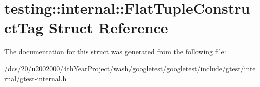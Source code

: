 \hypertarget{structtesting_1_1internal_1_1FlatTupleConstructTag}{}\section{testing\+:\+:internal\+:\+:Flat\+Tuple\+Construct\+Tag Struct Reference}
\label{structtesting_1_1internal_1_1FlatTupleConstructTag}


The documentation for this struct was generated from the following file\+:\begin{DoxyCompactItemize}
\item 
/dcs/20/u2002000/4th\+Year\+Project/wash/googletest/googletest/include/gtest/internal/gtest-\/internal.\+h\end{DoxyCompactItemize}
